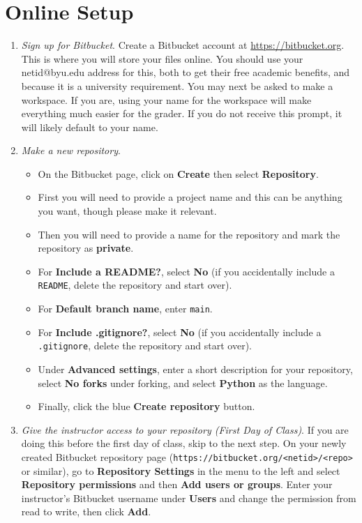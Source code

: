 \section*{Online Setup}
\begin{enumerate}
  \item \emph{Sign up for Bitbucket}.
  \label{step:sign-up}
  Create a Bitbucket account at \url{https://bitbucket.org}.
  This is where you will store your files online.
  You should use your netid@byu.edu address for this, both to get their free academic benefits, and because it is a university requirement.
  You may next be asked to make a workspace. 
  If you are, using your name for the workspace will make everything much easier for the grader.
  If you do not receive this prompt, it will likely default to your name.
  
  \item \emph{Make a new repository}.
  \begin{itemize}
    \item On the Bitbucket page, click on \textbf{Create} then select \textbf{Repository}.
    \item First you will need to provide a project name and this can be anything you want, though please make it relevant.
    \item Then you will need to provide a name for the repository and mark the repository as \textbf{private}.
    
    \item For \textbf{Include a README?}, select \textbf{No} (if you accidentally include a \texttt{README}, delete the repository and start over).
    \item For \textbf{Default branch name}, enter \texttt{main}. 
    \item For \textbf{Include .gitignore?}, select \textbf{No} (if you accidentally include a \texttt{.gitignore}, delete the repository and start over).
    \item Under \textbf{Advanced settings}, enter a short description for your repository, select \textbf{No forks} under forking, and select \textbf{Python} as the language.
    \item Finally, click the blue \textbf{Create repository} button.
    \end{itemize}
  
  \item \emph{Give the instructor access to your repository (First Day of Class)}.
  If you are doing this before the first day of class, skip to the next step.
  On your newly created Bitbucket repository page (\texttt{https://bitbucket.org/<netid>/<repo>} or similar), go to \textbf{Repository Settings} in the menu to the left and select \textbf{Repository permissions} and then \textbf{Add users or groups}.
  Enter your instructor's Bitbucket username under \textbf{Users} and change the permission from read to write, then click \textbf{Add}.
  

\end{enumerate}
